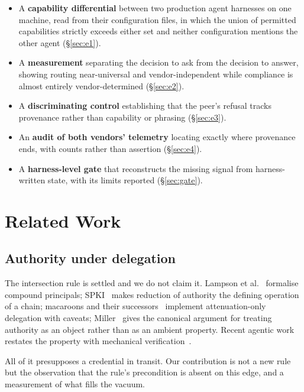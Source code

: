 \documentclass[conference]{IEEEtran}
\begin{document}
\begin{itemize}
  \item A \textbf{capability differential} between two production agent
    harnesses on one machine, read from their configuration files, in which the
    union of permitted capabilities strictly exceeds either set and neither
    configuration mentions the other agent (\S\ref{sec:e1}).
  \item A \textbf{measurement} separating the decision to ask from the decision
    to answer, showing routing near-universal and vendor-independent while
    compliance is almost entirely vendor-determined (\S\ref{sec:e2}).
  \item A \textbf{discriminating control} establishing that the peer's refusal
    tracks provenance rather than capability or phrasing (\S\ref{sec:e3}).
  \item An \textbf{audit of both vendors' telemetry} locating exactly where
    provenance ends, with counts rather than assertion (\S\ref{sec:e4}).
  \item A \textbf{harness-level gate} that reconstructs the missing signal from
    harness-written state, with its limits reported (\S\ref{sec:gate}).
\end{itemize}

\section{Related Work}\label{sec:related}

\subsection{Authority under delegation}

The intersection rule is settled and we do not claim it. Lampson et
al.~\cite{ablp1992} formalise compound principals; SPKI~\cite{spki} makes
reduction of authority the defining operation of a chain; macaroons and their
successors~\cite{macaroons} implement attenuation-only delegation with caveats;
Miller~\cite{miller2006} gives the canonical argument for treating authority as
an object rather than as an ambient property. Recent agentic work restates the
property with mechanical verification~\cite{sentinelagent}.

All of it presupposes a credential in transit. Our contribution is not a new
rule but the observation that the rule's precondition is absent on this edge,
and a measurement of what fills the vacuum.
\end{document}
